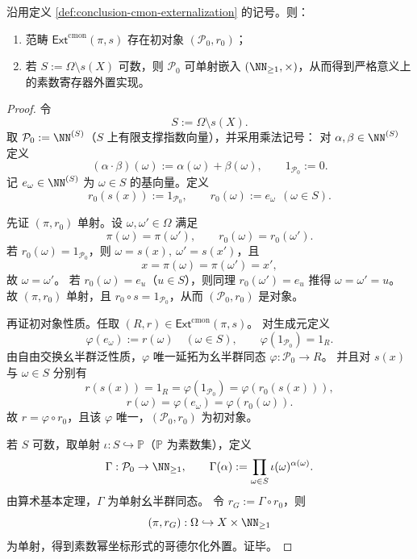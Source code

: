 \begin{theorem}[哥德尔化外置的普适素数寄存器]\label{thm:conclusion-cmon-externalization-initial-prime-register}
沿用定义 \ref{def:conclusion-cmon-externalization} 的记号。则：
\begin{enumerate}
  \item 范畴 \(\mathsf{Ext}^{\mathrm{cmon}}(\pi,s)\) 存在初对象 \((\mathcal P_0,r_0)\)；
  \item 若 \(S:=\Omega\setminus s(X)\) 可数，则 \(\mathcal P_0\) 可单射嵌入 \((\NN_{\ge 1},\times)\)，从而得到严格意义上的素数寄存器外置实现。
\end{enumerate}
\end{theorem}
\begin{proof}
令
\[
S:=\Omega\setminus s(X).
\]
取 \(\mathcal P_0:=\NN^{(S)}\)（\(S\) 上有限支撑指数向量），并采用乘法记号：
对 \(\alpha,\beta\in\NN^{(S)}\) 定义
\[
(\alpha\cdot\beta)(\omega):=\alpha(\omega)+\beta(\omega),\qquad 1_{\mathcal P_0}:=0.
\]
记 \(e_\omega\in\NN^{(S)}\) 为 \(\omega\in S\) 的基向量。定义
\[
r_0(s(x)):=1_{\mathcal P_0},\qquad
r_0(\omega):=e_\omega\ \ (\omega\in S).
\]

先证 \((\pi,r_0)\) 单射。设 \(\omega,\omega'\in\Omega\) 满足
\[
\pi(\omega)=\pi(\omega'),\qquad r_0(\omega)=r_0(\omega').
\]
若 \(r_0(\omega)=1_{\mathcal P_0}\)，则 \(\omega=s(x),\ \omega'=s(x')\)，且
\[
x=\pi(\omega)=\pi(\omega')=x',
\]
故 \(\omega=\omega'\)。
若 \(r_0(\omega)=e_u\)（\(u\in S\)），则同理 \(r_0(\omega')=e_u\) 推得 \(\omega=\omega'=u\)。
故 \((\pi,r_0)\) 单射，且 \(r_0\circ s=1_{\mathcal P_0}\)，从而 \((\mathcal P_0,r_0)\) 是对象。

再证初对象性质。任取 \((R,r)\in\mathsf{Ext}^{\mathrm{cmon}}(\pi,s)\)。
对生成元定义
\[
\varphi(e_\omega):=r(\omega)\quad(\omega\in S),\qquad \varphi(1_{\mathcal P_0})=1_R.
\]
由自由交换幺半群泛性质，\(\varphi\) 唯一延拓为幺半群同态 \(\varphi:\mathcal P_0\to R\)。
并且对 \(s(x)\) 与 \(\omega\in S\) 分别有
\[
r(s(x))=1_R=\varphi(1_{\mathcal P_0})=\varphi(r_0(s(x))),
\]
\[
r(\omega)=\varphi(e_\omega)=\varphi(r_0(\omega)).
\]
故 \(r=\varphi\circ r_0\)，且该 \(\varphi\) 唯一，\((\mathcal P_0,r_0)\) 为初对象。

若 \(S\) 可数，取单射 \(\iota:S\hookrightarrow\mathbb P\)（\(\mathbb P\) 为素数集），定义
\[
\Gamma:\mathcal P_0\to\NN_{\ge 1},\qquad
\Gamma(\alpha):=\prod_{\omega\in S}\iota(\omega)^{\alpha(\omega)}.
\]
由算术基本定理，\(\Gamma\) 为单射幺半群同态。
令 \(r_G:=\Gamma\circ r_0\)，则
\[
(\pi,r_G):\Omega\hookrightarrow X\times \NN_{\ge 1}
\]
为单射，得到素数幂坐标形式的哥德尔化外置。证毕。
\end{proof}

